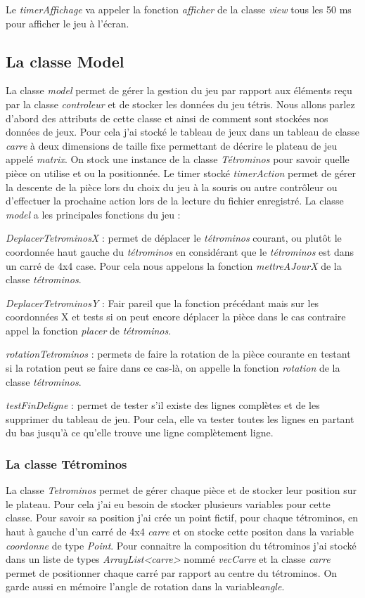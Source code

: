 \documentclass{article}           %
\begin{document}
Le \emph{timerAffichage} va appeler la fonction \emph{afficher} de la classe \emph{view} tous les 50 ms pour afficher le jeu à l'écran.

\subsection{La classe Model}
La classe \emph{model} permet de gérer la gestion du jeu par rapport aux éléments reçu par la classe \emph{controleur} et de stocker les données du jeu tétris.
Nous allons parlez d'abord des attributs de cette classe et ainsi de comment sont stockées nos données de jeux. Pour cela j'ai stocké le tableau de jeux dans un tableau de classe \emph{carre} à deux dimensions de taille fixe permettant de décrire le plateau de jeu appelé \emph{matrix}. On stock une instance de la classe \emph{Tétrominos} pour savoir quelle pièce on utilise et ou la positionnée.
Le timer stocké \emph{timerAction} permet de gérer la descente de la pièce lors du choix du jeu à la souris ou autre contrôleur ou d'effectuer la prochaine action lors de la lecture du fichier enregistré.
La classe \emph{model} a les principales fonctions du jeu :

\emph{DeplacerTetrominosX} : permet de déplacer le \emph{tétrominos} courant, ou plutôt le coordonnée haut gauche du \emph{tétrominos} en considérant que le \emph{tétrominos} est dans un carré de 4x4 case. Pour cela nous appelons la fonction \emph{mettreAJourX} de la classe \emph{tétrominos}.

\emph{DeplacerTetrominosY} : Fair pareil que la fonction précédant mais sur les coordonnées X et tests si on peut encore déplacer la pièce dans le cas contraire appel la fonction \emph{placer} de \emph{tétrominos}.

\emph{rotationTetrominos} : permets de faire la rotation de la pièce courante en testant si la rotation peut se faire dans ce cas-là, on appelle la fonction \emph{rotation} de la classe \emph{tétrominos}.

\emph{testFinDeligne} : permet de tester s'il existe des lignes complètes et de les supprimer du tableau de jeu. Pour cela, elle va tester toutes les lignes en partant du bas jusqu'à ce qu'elle trouve une ligne complètement ligne.

\subsubsection{La classe Tétrominos}
La classe \emph{Tetrominos} permet de gérer chaque pièce et de stocker leur position sur le plateau. Pour cela j'ai eu besoin de stocker plusieurs variables pour cette classe.
Pour savoir sa position j'ai crée un point fictif, pour chaque tétrominos, en haut à gauche d'un carré de 4x4 \emph{carre} et on stocke cette positon dans la variable \emph{coordonne} de type \emph{Point}. Pour connaitre la composition du tétrominos j'ai stocké dans un liste de types \emph{ArrayList<carre>} nommé \emph {vecCarre} et la classe \emph {carre} permet de positionner chaque carré par rapport au centre du tétrominos. On garde aussi en mémoire l'angle de rotation dans la variable\emph{angle}.
\end{document}
